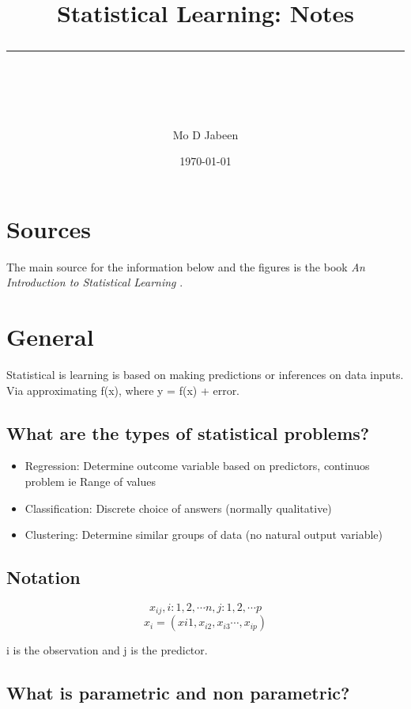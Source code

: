 \documentclass[11pt]{scrartcl} %
\title{	
	\normalfont\normalsize
	\vspace{20pt} %
	{\huge Statistical Learning: Notes}\\ %
	\vspace{12pt} %
	\rule{\linewidth}{2pt}\\ %
}
\author{\small Mo D Jabeen} %
\date{\normalsize\today} %
\begin{document}
\maketitle %

\tableofcontents

\newpage

\section{Sources}

The main source for the information below and the figures is the book \textit{An Introduction to Statistical Learning} \cite{james2013introduction}.

\section{General}

Statistical is learning is based on making predictions or inferences on data inputs. Via approximating f(x),
where y = f(x) + error.

\subsection{What are the types of statistical problems?}

\begin{itemize}
	\item Regression: Determine outcome variable based on predictors, continuos problem ie Range of values 
	\item Classification: Discrete choice of answers (normally qualitative)
	\item Clustering: Determine similar groups of data (no natural output variable)
\end{itemize}

\subsection{Notation}

\begin{equation}
	x_{ij}, i:1,2,\cdots n, j:1,2,\cdots p
\end{equation}
\begin{equation}
	x_{i} = (x{i1},x_{i2},x_{i3} \cdots,x_{ip})
\end{equation}

i is the observation and j is the predictor.

\subsection{What is parametric and non parametric?}
\end{document}
